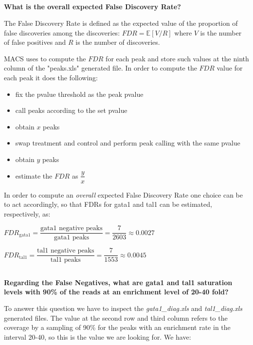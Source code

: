 \documentclass[12pt, a4paper]{article}
\begin{document}
	\subsection{}
	\textbf{What is the overall expected False Discovery Rate?}
	
	The False Discovery Rate is defined as the expected value of the proportion of false discoveries among the discoveries: $ FDR = \mathbb{E}[ V / R ]$ where $V$ is the number of false positives and $R$ is the number of discoveries.
	
	MACS uses to compute the $FDR$ for each peak and store such values at the ninth column of the "peaks.xls" generated file. In order to compute the $FDR$ value for each peak it does the following:
	
	\begin{itemize}
		\item fix the pvalue threshold as the peak pvalue
		\item call peaks according to the set pvalue
		\item obtain $x$ peaks
		\item swap treatment and control and perform peak calling with the same pvalue
		\item obtain $y$ peaks
		\item estimate the $FDR$ as $\dfrac{y}{x}$
	\end{itemize}
	
	In order to compute an \textit{overall} expected False Discovery Rate one choice can be to act accordingly, so that FDRs for gata1 and tal1 can be estimated, respectively, as:
	
	$FDR_\text{gata1} = \dfrac{\text{gata1 negative peaks}}{\text{gata1 peaks}} = \dfrac{7}{2603} \approx{0.0027}$
	
	
	$FDR_\text{tal1} = \dfrac{\text{tal1 negative peaks}}{\text{tal1 peaks}} = \dfrac{7}{1553} \approx{0.0045}$
	
	\subsection{}
	\textbf{Regarding the False Negatives, what are gata1 and tal1 saturation levels with 90\% of the reads at an enrichment level of 20-40 fold?}
	
	To answer this question we have to inspect the \textit{gata1\_diag.xls } and \textit{tal1\_diag.xls} generated files. The value at the second row and third column refers to the coverage by a sampling of 90\% for the peaks with an enrichment rate in the interval 20-40, so this is the value we are looking for. We have:\\
	
\end{document}
